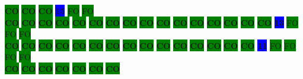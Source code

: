 \colorbox{green}{\color[rgb]{0,0,0}\textbf{CO}}%
\colorbox{green}{\color[rgb]{0,0,0}\textbf{CO}}%
\colorbox{green}{\color[rgb]{0,0,0}\textbf{CO}}%
\colorbox{blue}{\color[rgb]{1,0,0}\textbf{15}}%
\colorbox{green}{\color[gray]{0.75}FO}%
\colorbox{green}{\color[gray]{0.75}FO}%
\\
\colorbox{green}{\color[rgb]{0,0,0}\textbf{CO}}%
\colorbox{green}{\color[rgb]{0,0,0}\textbf{CO}}%
\colorbox{green}{\color[rgb]{0,0,0}\textbf{CO}}%
\colorbox{green}{\color[rgb]{0,0,0}\textbf{CO}}%
\colorbox{green}{\color[rgb]{0,0,0}\textbf{CO}}%
\colorbox{green}{\color[rgb]{0,0,0}\textbf{CO}}%
\colorbox{green}{\color[rgb]{0,0,0}\textbf{CO}}%
\colorbox{green}{\color[rgb]{0,0,0}\textbf{CO}}%
\colorbox{green}{\color[rgb]{0,0,0}\textbf{CO}}%
\colorbox{green}{\color[rgb]{0,0,0}\textbf{CO}}%
\colorbox{green}{\color[rgb]{0,0,0}\textbf{CO}}%
\colorbox{green}{\color[rgb]{0,0,0}\textbf{CO}}%
\colorbox{green}{\color[rgb]{0,0,0}\textbf{CO}}%
\colorbox{green}{\color[rgb]{0,0,0}\textbf{CO}}%
\colorbox{green}{\color[rgb]{0,0,0}\textbf{CO}}%
\colorbox{green}{\color[rgb]{0,0,0}\textbf{CO}}%
\colorbox{blue}{\color[rgb]{1,0,0}\textbf{13}}%
\colorbox{green}{\color[gray]{0.75}FO}%
\colorbox{green}{\color[gray]{0.75}FO}%
\colorbox{green}{\color[gray]{0.75}FO}%
\\
\colorbox{green}{\color[rgb]{0,0,0}\textbf{CO}}%
\colorbox{green}{\color[rgb]{0,0,0}\textbf{CO}}%
\colorbox{green}{\color[rgb]{0,0,0}\textbf{CO}}%
\colorbox{green}{\color[rgb]{0,0,0}\textbf{CO}}%
\colorbox{green}{\color[rgb]{0,0,0}\textbf{CO}}%
\colorbox{green}{\color[rgb]{0,0,0}\textbf{CO}}%
\colorbox{green}{\color[rgb]{0,0,0}\textbf{CO}}%
\colorbox{green}{\color[rgb]{0,0,0}\textbf{CO}}%
\colorbox{green}{\color[rgb]{0,0,0}\textbf{CO}}%
\colorbox{green}{\color[rgb]{0,0,0}\textbf{CO}}%
\colorbox{green}{\color[rgb]{0,0,0}\textbf{CO}}%
\colorbox{green}{\color[rgb]{0,0,0}\textbf{CO}}%
\colorbox{green}{\color[rgb]{0,0,0}\textbf{CO}}%
\colorbox{green}{\color[rgb]{0,0,0}\textbf{CO}}%
\colorbox{green}{\color[rgb]{0,0,0}\textbf{CO}}%
\colorbox{blue}{\color[rgb]{1,0,0}\textbf{11}}%
\colorbox{green}{\color[gray]{0.75}FO}%
\colorbox{green}{\color[gray]{0.75}FO}%
\colorbox{green}{\color[gray]{0.75}FO}%
\colorbox{green}{\color[gray]{0.75}FO}%
\\
\colorbox{green}{\color[rgb]{0,0,0}\textbf{CO}}%
\colorbox{green}{\color[rgb]{0,0,0}\textbf{CO}}%
\colorbox{green}{\color[rgb]{0,0,0}\textbf{CO}}%
\colorbox{green}{\color[rgb]{0,0,0}\textbf{CO}}%
\colorbox{green}{\color[rgb]{0,0,0}\textbf{CO}}%
\colorbox{green}{\color[rgb]{0,0,0}\textbf{CO}}%
\colorbox{green}{\color[rgb]{0,0,0}\textbf{CO}}%
